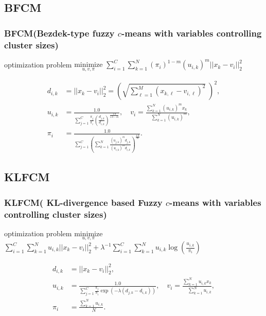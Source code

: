 \documentclass[fleqn,dvipdfmx,10pt]{beamer}
\begin{document}
\subsection{BFCM}
\begin{frame}\frametitle{BFCM\scriptsize{(Bezdek-type fuzzy $c$-means with
      variables controlling cluster sizes)}}
  \begin{block}{optimization problem}
    $\underset{u,v,\pi}{\text{minimize}}$
    $\sum_{i=1}^C\sum_{k=1}^N(\pi_{i})^{1-m}(u_{i,k})^m||x_k-v_i||_2^2$\centering\\
  \end{block}
  \begin{align*}
    d_{i,k}&=||x_{k}-v_{i}||_{2}^2=\left(\sqrt{\sum_{\ell=1}^M (x_{k,\ell}-v_{i,\ell})^2}\;\right)^2,\\
    u_{i,k}&=\frac{1.0}{\sum_{j=1}^C\frac{\pi_{j}}{\pi_{i}}\left(\frac{d_{j,k}}{d_{i,k}}\right)^\frac{1.0}{1.0-m}},\quad
    v_{i}=\frac{\sum_{k=1}^N(u_{i,k})^mx_{k}}{\quad\sum_{k=1}^N(u_{i,k})^{m}},\\
    \pi_{i}&=\frac{1.0}{\sum_{j=1}^C\left(\sum_{k=1}^N\frac{(u_{j,k})^md_{j,k}}{(u_{i,k})^md_{i,k}}\right)^{\frac{1.0}{m}}}.
  \end{align*}
\end{frame}

\subsection{KLFCM}
\begin{frame}\frametitle{KLFCM\scriptsize(%
    KL-divergence based Fuzzy $c$-means with variables controlling cluster sizes)}
  \begin{block}{optimization problem}
    $\underset{u,v,\pi}{\text{minimize}}$
    $\sum_{i=1}^C\sum_{k=1}^Nu_{i,k}||x_k-v_i||_2^2+\lambda^{-1}\sum_{i=1}^C\sum_{k=1}^Nu_{i,k}\log(\frac{u_{i,k}}{\pi_{i}})$\centering\\
  \end{block}
  \begin{align*}
    d_{i,k}&=||x_{k}-v_{i}||_{2}^2, \\
    u_{i,k}&=\frac{1.0}{\sum_{j=1}^C\frac{\pi_{j}}{\pi_{i}}\exp\left(-\lambda(d_{j,k}-d_{i,k})\right)},\quad
    v_{i}=\frac{\sum_{k=1}^Nu_{i,k}x_{k}}{\quad\sum_{k=1}^Nu_{i,k}},\\
    \pi_{i}&=\frac{\sum_{k=1}^Nu_{i,k}}{\quad N}.
  \end{align*}
\end{frame}
\end{document}
